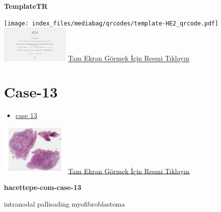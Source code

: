 \documentclass[
  letterpaper,
  DIV=11,
  numbers=noendperiod]{scrreprt}
\providecommand{\tightlist}{%
  \setlength{\itemsep}{0pt}\setlength{\parskip}{0pt}}\usepackage{longtable,booktabs,array}
\begin{document}
\textbf{TemplateTR}

\texttt{[image: index\_files/mediabag/qrcodes/template-HE2\_qrcode.pdf]}
\href{https://images.patolojiatlasi.com/template/HE2.html}{\includegraphics[width=0.25\textwidth,height=\textheight]{./screenshots/thumbnail_template-HE2.png}}
\href{https://images.patolojiatlasi.com/template/HE2.html}{Tam Ekran
Görmek İçin Resmi Tıklayın}

\hypertarget{sec-hacettepe-case-of-the-month-case-13}{%
\section{Case-13}\label{sec-hacettepe-case-of-the-month-case-13}}

\begin{itemize}
\tightlist
\item
  \href{https://www.youtube.com/watch?v=TLRJ0pBrwxA&ab_channel=KemalKosemehmetoglu}{case
  13}
\end{itemize}

\href{https://images.patolojiatlasi.com/hacettepe-com-case-13/HE.html}{\includegraphics[width=0.25\textwidth,height=\textheight]{./screenshots/thumbnail_hacettepe-com-case-13.png}}
\href{https://images.patolojiatlasi.com/hacettepe-com-case-13/HE.html}{Tam
Ekran Görmek İçin Resmi Tıklayın}

\textbf{hacettepe-com-case-13}

\begin{tcolorbox}[enhanced jigsaw, breakable, opacitybacktitle=0.6, arc=.35mm, colbacktitle=quarto-callout-tip-color!10!white, colback=white, toptitle=1mm, left=2mm, opacityback=0, colframe=quarto-callout-tip-color-frame, titlerule=0mm, rightrule=.15mm, bottomrule=.15mm, toprule=.15mm, bottomtitle=1mm, title=\textcolor{quarto-callout-tip-color}{\faLightbulb}\hspace{0.5em}{Tanı}, coltitle=black, leftrule=.75mm]

intranodal pallisading myofibroblastoma

\end{tcolorbox}
\end{document}
